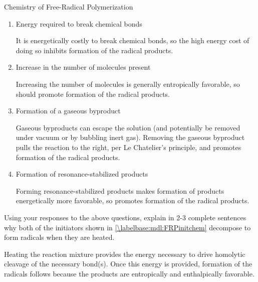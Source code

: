 \begin{activity}{Chemistry of Free-Radical Polymerization}
\begin{exercises}
		\begin{enumerate}
			\item Energy required to break chemical bonds
	
				\begin{solution}{}
					It is energetically costly to break chemical bonds, so the high energy cost of doing so inhibits formation of the radical products.
				\end{solution}
			
			\item Increase in the number of molecules present
	
				\begin{solution}{}
					Increasing the number of molecules is generally entropically favorable, so should promote formation of the radical products.
				\end{solution}
			
			\item Formation of a gaseous byproduct
	
				\begin{solution}{}
					Gaseous byproducts can escape the solution (and potentially be removed under vacuum or by bubbling inert gas).  Removing the gaseous byproduct pulls the reaction to the right, per Le Chatelier's principle, and promotes formation of the radical products.
				\end{solution}
			
			\item Formation of resonance-stabilized products
	
				\begin{solution}{}
					Forming resonance-stabilized products makes formation of products energetically more favorable, so promotes formation of the radical products.
				\end{solution}
		\end{enumerate}
		
		Using your responses to the above questions, explain in 2-3 complete sentences why both of the initiators shown in \ref{\labelbase:mdl:FRPinitchem} decompose to form radicals when they are heated.
		
	
				\begin{solution}{}
					Heating the reaction mixture provides the energy necessary to drive homolytic cleavage of the necessary bond(s).  Once this energy is provided, formation of the radicals follows because the products are entropically and enthalpically favorable.
				\end{solution}


\end{exercises}
\end{activity}
